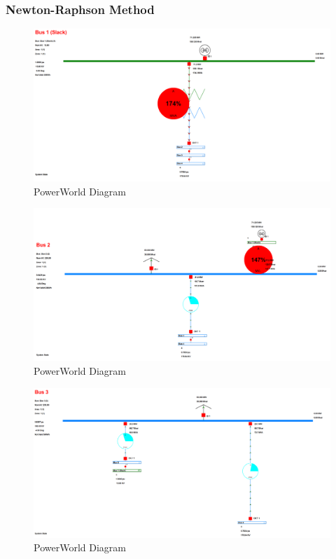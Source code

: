\documentclass[12pt]{article}
\begin{document}
        \subsubsection{Newton-Raphson Method}
        \begin{figure}[H]
            \centerline{\includegraphics[scale=0.25]{images/PowerWorldBus1}}
            \caption{PowerWorld Diagram}
        \end{figure}

        \begin{figure}[H]
            \centerline{\includegraphics[scale=0.25]{images/PowerWorldBus2}}
            \caption{PowerWorld Diagram}
        \end{figure}

        \begin{figure}[H]
            \centerline{\includegraphics[scale=0.25]{images/PowerWorldBus3}}
            \caption{PowerWorld Diagram}
        \end{figure}
\end{document}
